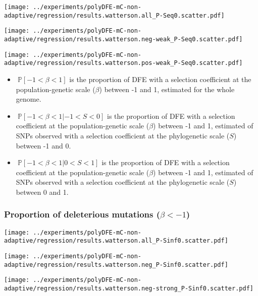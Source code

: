\documentclass{article}
\newcommand{\proba}{\mathbb{P}}
\newcommand{\Sphy}{S}
\newcommand{\divWeakDel}{-1 < \Sphy < 0}
\newcommand{\divWeakAdv}{0 < \Sphy < 1}
\newcommand{\Spop}{\beta}
\newcommand{\polyDel}{\Spop < -1}
\newcommand{\polyNeutral}{-1 < \Spop < 1}
\begin{document}
    \begin{minipage}{0.32\linewidth}
        \texttt{[image: ../experiments/polyDFE-mC-non-adaptive/regression/results.watterson.all\_P-Seq0.scatter.pdf]}
    \end{minipage}
    \begin{minipage}{0.32\linewidth}
        \texttt{[image: ../experiments/polyDFE-mC-non-adaptive/regression/results.watterson.neg-weak\_P-Seq0.scatter.pdf]}
    \end{minipage}
    \begin{minipage}{0.32\linewidth}
        \texttt{[image: ../experiments/polyDFE-mC-non-adaptive/regression/results.watterson.pos-weak\_P-Seq0.scatter.pdf]}
    \end{minipage}

    \begin{itemize}
        \item $\ \proba [ \polyNeutral ]$ is the proportion of DFE with a selection coefficient at the population-genetic scale ($\Spop$) between -1 and 1, estimated for the whole genome.
        \item $\ \proba [ \polyNeutral | \divWeakDel]$ is the proportion of DFE with a selection coefficient at the population-genetic scale ($\Spop$) between -1 and 1, estimated of SNPs observed with a selection coefficient at the phylogenetic scale ($\Sphy$) between -1 and 0.
        \item $\ \proba [ \polyNeutral | \divWeakAdv ]$ is the proportion of DFE with a selection coefficient at the population-genetic scale ($\Spop$) between -1 and 1, estimated of SNPs observed with a selection coefficient at the phylogenetic scale ($\Sphy$) between 0 and 1.
    \end{itemize}

    \subsubsection{Proportion of deleterious mutations ($\polyDel$)}

    \begin{minipage}{0.32\linewidth}
        \texttt{[image: ../experiments/polyDFE-mC-non-adaptive/regression/results.watterson.all\_P-Sinf0.scatter.pdf]}
    \end{minipage}
    \begin{minipage}{0.32\linewidth}
        \texttt{[image: ../experiments/polyDFE-mC-non-adaptive/regression/results.watterson.neg\_P-Sinf0.scatter.pdf]}
    \end{minipage}
    \begin{minipage}{0.32\linewidth}
        \texttt{[image: ../experiments/polyDFE-mC-non-adaptive/regression/results.watterson.neg-strong\_P-Sinf0.scatter.pdf]}
    \end{minipage}
\end{document}

